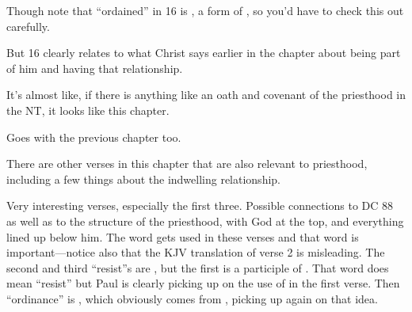 \begin{compactdesc}
\begin{compactitem}
\begin{compactitem}
								\item Though note that ``ordained'' in 16 is , a form of , so you'd have to check this out carefully.
								\item But 16 clearly relates to what Christ says earlier in the chapter about being part of him and having that relationship.
							\end{compactitem}
						\item It's almost like, if there is anything like an oath and covenant of the priesthood in the NT, it looks like this chapter.
					\end{compactitem}
				\item[{\hyperref[JOHN-16-15]{John 16:15}}] \phantom{.}
					\begin{compactitem}
						\item Goes with the previous chapter too.
					\end{compactitem}
				\item[{\hyperref[JOHN-17-2]{John 17:2}}] \phantom{.}
					\begin{compactitem}
						\item There are other verses in this chapter that are also relevant to priesthood, including a few things about the indwelling relationship.
					\end{compactitem}
				\item[{\hyperref[JOHN-19-10]{John 19:10--11}}]
				\item[{\hyperref[JOHN-20-21]{John 20:21--22}}]
				\item[{\hyperref[ROMANS-1-16]{Romans 1:16--20}}]
				\item[{\hyperref[ROMANS-8-7]{Romans 8:7}}]
				\item[{\hyperref[ROMANS-13-1]{Romans 13:1--5}}] \phantom{.}
					\begin{compactitem}
						\item Very interesting verses, especially the first three. Possible connections to DC 88 as well as to the structure of the priesthood, with God at the top, and everything lined up below him. The word  gets used in these verses and that word is important---notice also that the KJV translation of verse 2 is misleading. The second and third ``resist''s are , but the first is a participle of . That word does mean ``resist'' but Paul is clearly picking up on the use of  in the first verse. Then ``ordinance'' is , which obviously comes from , picking up again on that idea. 

\end{compactitem}
\end{compactdesc}
